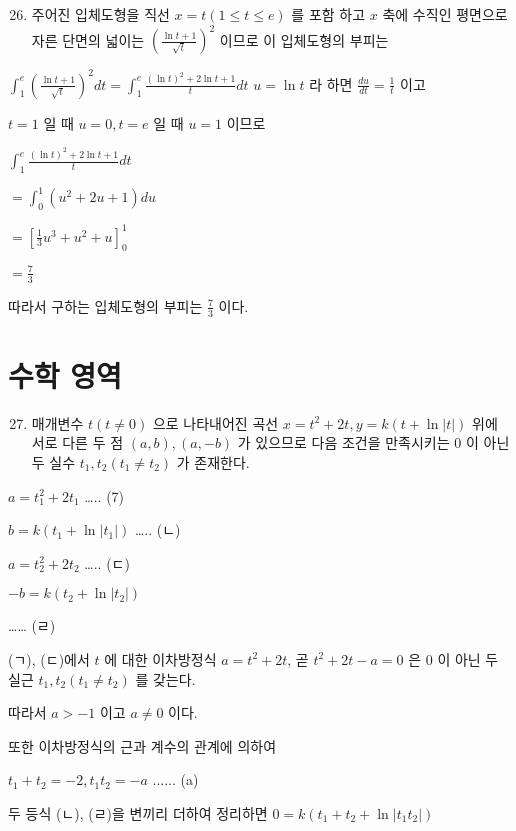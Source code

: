 \documentclass[10pt]{article}
\begin{document}
\begin{enumerate}
  \setcounter{enumi}{25}
  \item 주어진 입체도형을 직선 $x=t(1 \leq t \leq e)$ 를 포함 하고 $x$ 축에 수직인 평면으로 자른 단면의 넓이는 $\left(\frac{\ln t+1}{\sqrt{t}}\right)^{2}$ 이므로 이 입체도형의 부피는
\end{enumerate}

$\int_{1}^{e}\left(\frac{\ln t+1}{\sqrt{t}}\right)^{2} d t=\int_{1}^{e} \frac{(\ln t)^{2}+2 \ln t+1}{t} d t$ $u=\ln t$ 라 하면 $\frac{d u}{d t}=\frac{1}{t}$ 이고

$t=1$ 일 때 $u=0, t=e$ 일 때 $u=1$ 이므로

$\int_{1}^{e} \frac{(\ln t)^{2}+2 \ln t+1}{t} d t$

$=\int_{0}^{1}\left(u^{2}+2 u+1\right) d u$

$=\left[\frac{1}{3} u^{3}+u^{2}+u\right]_{0}^{1}$

$=\frac{7}{3}$

따라서 구하는 입체도형의 부피는 $\frac{7}{3}$ 이다.

\section*{수학 영역}
\begin{enumerate}
  \setcounter{enumi}{26}
  \item 매개변수 $t(t \neq 0)$ 으로 나타내어진 곡선 $x=t^{2}+2 t, y=k(t+\ln |t|)$ 위에 서로 다른 두 점 $(a, b),(a,-b)$ 가 있으므로 다음 조건을 만족시키는 0 이 아닌 두 실수 $t_{1}, t_{2}\left(t_{1} \neq t_{2}\right)$ 가 존재한다.
\end{enumerate}

$a=t_{1}^{2}+2 t_{1}$ ….. (7)

$b=k\left(t_{1}+\ln \left|t_{1}\right|\right)$ ….. (ㄴ)

$a=t_{2}^{2}+2 t_{2}$ ….. (ㄷ)

$-b=k\left(t_{2}+\ln \left|t_{2}\right|\right)$

…… (ㄹ)

(ㄱ), (ㄷ)에서 $t$ 에 대한 이차방정식 $a=t^{2}+2 t$, 곧 $t^{2}+2 t-a=0$ 은 0 이 아닌 두 실근 $t_{1}, t_{2}\left(t_{1} \neq t_{2}\right)$ 를 갖는다.

따라서 $a>-1$ 이고 $a \neq 0$ 이다.

또한 이차방정식의 근과 계수의 관계에 의하여

$t_{1}+t_{2}=-2, t_{1} t_{2}=-a$ ...... (a)

두 등식 (ㄴ), (ㄹ)을 변끼리 더하여 정리하면 $0=k\left(t_{1}+t_{2}+\ln \left|t_{1} t_{2}\right|\right)$
\end{document}
